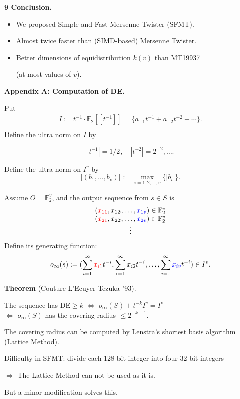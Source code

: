 \documentclass[a4j,12pt,landscape]{jarticle}
\def\F2{{\mathbb F}_2}
\begin{document}
\newpage
{\bf 9 Conclusion.}
\begin{itemize}
\item We proposed Simple and Fast Mersenne Twister (SFMT). 
\item Almost twice faster than (SIMD-based) Mersenne Twister.
\item Better dimensions of equidistribution $k(v)$ than MT19937 

(at most values of $v$).
\end{itemize}

\newpage
{\bf Appendix A: Computation of DE.}

Put
$$
\begin{array}{l}
I:=t^{-1}\cdot \F2[[t^{-1}]]
=\{a_{-1}t^{-1}+a_{-2}t^{-2}+\cdots \}
. \\
\end{array}
$$
Define the ultra norm on $I$ by 

$$|t^{-1}|=1/2, \quad |t^{-2}|=2^{-2}, \ldots.$$

Define the ultra norm on $I^v$ by
$$
|(b_1,\ldots,b_v)|:= \max_{i=1,2,\ldots,v} \{|b_i|\}.
$$

\newpage
Assume 
$O=\F2^v$, and 
the output sequence from $s \in S$
is 
$$
\begin{array}{c}
(\textcolor{red}{x_{11}},x_{12},\ldots,\textcolor{blue}{x_{1v}}) \in \F2^{v}\\
(\textcolor{red}{x_{21}},x_{22},\ldots,\textcolor{blue}{x_{2v}}) \in \F2^{v}\\
\vdots
\end{array}
$$
Define its generating function: 
$$
o_\infty(s):=(\sum_{i=1}^\infty \textcolor{red}{x_{i1}}t^{-i}, 
\sum_{i=1}^\infty x_{i2}t^{-i}, \ldots,
\sum_{i=1}^\infty \textcolor{blue}{x_{iv}}t^{-i}
) \in I^v.
$$

{\bf Theorem} (Couture-L'Ecuyer-Tezuka '93).
\begin{center}
The sequence has DE$\geq k$ 
$\Leftrightarrow$ 
$o_\infty(S) + t^{-k}I^v = I^v$ \\
$\Leftrightarrow$
$o_\infty(S)$ has the covering radius $\leq 2^{-k-1}$.
\end{center}

The covering radius can be computed by 
Lenstra's shortest basis algorithm (Lattice Method).

\newpage
Difficulty in SFMT: divide each 128-bit integer 
into four 32-bit integers 

$\Rightarrow$
The Lattice Method can not be used as it is.

But a minor modification solves this.
\end{document}
